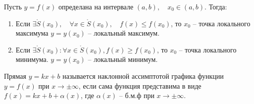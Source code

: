\begin{definition} \label{def:75}
    Пусть $y=f(x)$ определана на интервале $(a, b), \quad x_0 \in (a, b)$. Тогда: 
    \begin{enumerate}
        \item Если $\exists \mathring{S}(x_0), \quad \forall x \in  \mathring{S}(x_0), \quad f(x) \le  f(x_0)$, то $x_0$ -- точка локального максимума $y = y(x_0)$ -- локальный максимум.
        \item Если $\exists  \mathring{S}(x_0) : \forall x \in \mathring{S}(x_0), f(x) \ge  f(x_0)$, то $x_0$ -- точка локального минимума. $y=y(x_0)$ -- локальный минимум.
    \end{enumerate}
\end{definition}


\begin{definition} \label{def:84}
    Прямая $y = kx + b$ называется наклонной ассимптотой графика функции  $y=f(x)$ при $x \to  \pm\infty$, если сама функция представима в виде $f(x) = kx + b + \alpha(x)$, где $\alpha(x)$ -- б.м.ф при $x \to \pm\infty$.
\end{definition}
